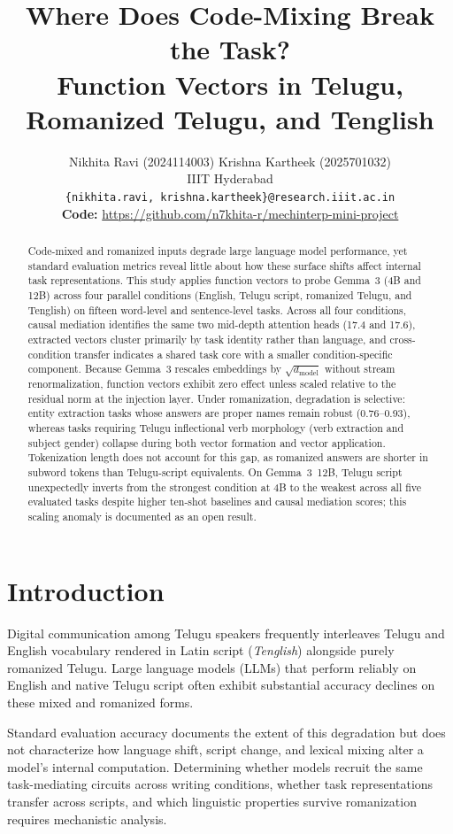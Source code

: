 \documentclass[11pt]{article}
\title{Where Does Code-Mixing Break the Task?\\
  Function Vectors in Telugu, Romanized Telugu, and Tenglish}
\author{Nikhita Ravi (2024114003) \quad Krishna Kartheek (2025701032) \\
  IIIT Hyderabad \\
  \texttt{\{nikhita.ravi, krishna.kartheek\}@research.iiit.ac.in}\\
  \small\textbf{Code:} \url{https://github.com/n7khita-r/mechinterp-mini-project}}
\begin{document}
\maketitle

\begin{abstract}
Code-mixed and romanized inputs degrade large language model performance, yet
standard evaluation metrics reveal little about how these surface shifts affect
internal task representations. This study applies function vectors
\cite{todd2024function} to probe Gemma~3 (4B and 12B) across four parallel
conditions (English, Telugu script, romanized Telugu, and Tenglish) on fifteen
word-level and sentence-level tasks. Across all four conditions, causal
mediation identifies the same two mid-depth attention heads (17.4 and 17.6),
extracted vectors cluster primarily by task identity rather than language, and
cross-condition transfer indicates a shared task core with a smaller
condition-specific component. Because Gemma~3 rescales embeddings by
$\sqrt{d_{\text{model}}}$ without stream renormalization, function vectors
exhibit zero effect unless scaled relative to the residual norm at the
injection layer. Under romanization, degradation is selective: entity
extraction tasks whose answers are proper names remain robust (0.76--0.93),
whereas tasks requiring Telugu inflectional verb morphology (verb extraction
and subject gender) collapse during both vector formation and vector
application. Tokenization length does not account for this gap, as romanized
answers are shorter in subword tokens than Telugu-script equivalents. On
Gemma~3~12B, Telugu script unexpectedly inverts from the strongest condition at
4B to the weakest across all five evaluated tasks despite higher ten-shot
baselines and causal mediation scores; this scaling anomaly is documented as an
open result.
\end{abstract}

\section{Introduction}

Digital communication among Telugu speakers frequently interleaves Telugu and
English vocabulary rendered in Latin script (\emph{Tenglish}) alongside purely
romanized Telugu. Large language models (LLMs) that perform reliably on English
and native Telugu script often exhibit substantial accuracy declines on these
mixed and romanized forms.

Standard evaluation accuracy documents the extent of this degradation but does
not characterize how language shift, script change, and lexical mixing alter a
model's internal computation. Determining whether models recruit the same
task-mediating circuits across writing conditions, whether task representations
transfer across scripts, and which linguistic properties survive romanization
requires mechanistic analysis.
\end{document}
